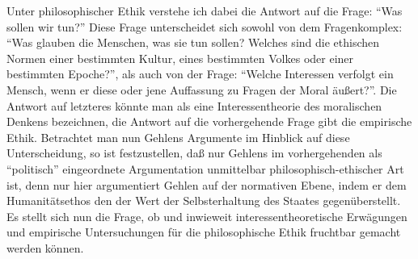 \documentclass[12pt,a4paper]{article}
\begin{document}
Unter philosophischer Ethik verstehe ich dabei die Antwort auf die Frage:
"`Was sollen wir tun?"' Diese Frage unterscheidet sich sowohl von dem
Fragenkomplex: "`Was glauben die Menschen, was sie tun sollen? Welches sind
die ethischen Normen einer bestimmten Kultur, eines bestimmten Volkes oder
einer bestimmten Epoche?"', als auch von der Frage: "`Welche Interessen
verfolgt ein Mensch, wenn er diese oder jene Auffassung zu Fragen der Moral
äußert?"'. Die Antwort auf letzteres könnte man als eine Interessentheorie
des moralischen Denkens bezeichnen, die Antwort auf die vorhergehende Frage
gibt die empirische Ethik. Betrachtet man nun Gehlens Argumente im Hinblick
auf diese Unterscheidung, so ist festzustellen, daß nur Gehlens im
vorhergehenden als "`politisch"' eingeordnete Argumentation unmittelbar
philosophisch-ethischer Art ist, denn nur hier argumentiert Gehlen auf der
normativen Ebene, indem er dem Humanitätsethos den der Wert der
Selbsterhaltung des Staates gegenüberstellt. Es stellt sich nun die Frage,
ob und inwieweit interessentheoretische Erwägungen und empirische
Untersuchungen für die philosophische Ethik fruchtbar gemacht werden
können.
\end{document}
